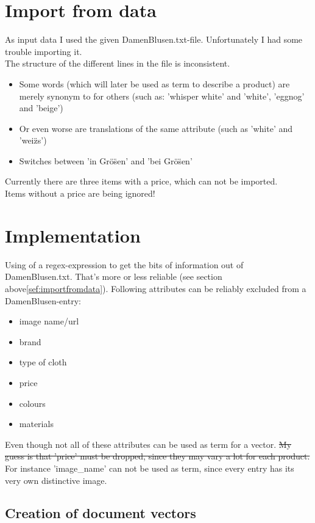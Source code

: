 

\section{Import from data}
\label{sec:importfromdata}
As input data I used the given DamenBlusen.txt-file.
Unfortunately I had some trouble importing it.\\
The structure of the different lines in the file is inconsistent.
\begin{itemize}
    \item Some words (which will later be used as term to describe a product) are merely synonym to for others (such as: 'whisper white' and 'white', 'eggnog' and 'beige')
    \item Or even worse are translations of the same attribute (such as 'white' and 'wei\"zs')
    \item Switches between 'in Gr\"o\"sen' and 'bei Gr\"o\"sen'
\end{itemize}
Currently there are three items with a price, which can not be imported.\\
Items without a price are being ignored!


\section{Implementation}
Using of a regex-expression to get the bits of information out of DamenBlusen.txt.
That's more or less reliable (see section above\ref{sef:importfromdata}).
Following attributes can be reliably excluded from a DamenBlusen-entry:
\begin{itemize}
    \item image name/url
    \item brand
    \item type of cloth
    \item price
    \item colours
    \item materials
\end{itemize}

\medskip
Even though not all of these attributes can be used as term for a vector.
\sout{My guess is that 'price' must be dropped, since they may vary a lot for each product.}
For instance 'image\_name' can not be used as term, since every entry has its very own distinctive image.

\subsection{Creation of document vectors}

